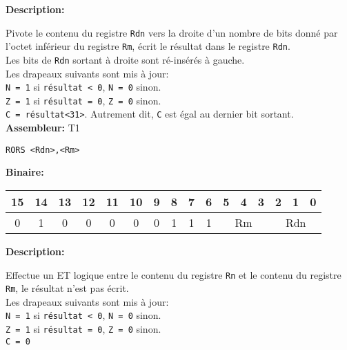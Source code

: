 \documentclass{article}
\begin{document}

    \textbf{Description: }

    Pivote le contenu du registre \texttt{Rdn} vers la droite d'un nombre de bits donné par l'octet inférieur du registre \texttt{Rm}, écrit le résultat dans le registre \texttt{Rdn}.\\
    Les bits de \texttt{Rdn} sortant à droite sont ré-insérés à gauche.\\
    Les drapeaux suivants sont mis à jour:\\
    \texttt{N = 1} si \texttt{résultat < 0}, \texttt{N = 0} sinon.\\
    \texttt{Z = 1} si \texttt{résultat = 0}, \texttt{Z = 0} sinon.\\
    \texttt{C = résultat<31>}.
    Autrement dit, \texttt{C} est égal au dernier bit sortant.\\

    \textbf{Assembleur:} T1

    \begin{lstlisting}
RORS <Rdn>,<Rm>
    \end{lstlisting}

    \textbf{Binaire:}\\

    \begin{tabular}{| c c c c c c c c c c c c c c c c |}
        \hline
        15 & 14 & 13 & 12 & 11 & 10 & \multicolumn{1}{|c}{9} & 8 & 7 & 6 & \multicolumn{1}{|c}{5} & 4 & 3 & \multicolumn{1}{|c}{2} & 1 & 0 \\
        \hline
        0 & 1 & 0 & 0 & 0 & 0 & \multicolumn{1}{|c}{0} & 1 & 1 & 1 & \multicolumn{3}{|c}{Rm} & \multicolumn{3}{|c|}{Rdn} \\
        \hline
    \end{tabular}



    \textbf{Description: }

    Effectue un ET logique entre le contenu du registre \texttt{Rn} et le contenu du registre \texttt{Rm}, le résultat n'est pas écrit.\\
    Les drapeaux suivants sont mis à jour:\\
    \texttt{N = 1} si \texttt{résultat < 0}, \texttt{N = 0} sinon.\\
    \texttt{Z = 1} si \texttt{résultat = 0}, \texttt{Z = 0} sinon.\\
    \texttt{C = 0}\\
\end{document}
